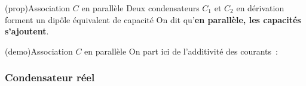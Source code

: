 \documentclass[../../main/main.tex]{subfiles}
\begin{document}
\begin{tcb*}[label=prop:cpara, sidebyside](prop){Association $C$ en parallèle}
	Deux condensateurs $C_1$ et $C_2$ en dérivation forment un dipôle
	équivalent de capacité
	\psw{%
		\[
			\boxed{C\ind{eq} = C_1 + C_2}
		\]
	}%
	On dit qu'\textbf{en parallèle, les capacités s'ajoutent}.
	\tcblower
	\begin{center}
	\end{center}
\end{tcb*}
\begin{tcb*}[label=demo:cpara](demo){Association $C$ en parallèle}
	On part ici de l'additivité des courants~:
	\vspace{-15pt}
\end{tcb*}

\vspace{-15pt}
\subsubsection{Condensateur réel}
\end{document}
